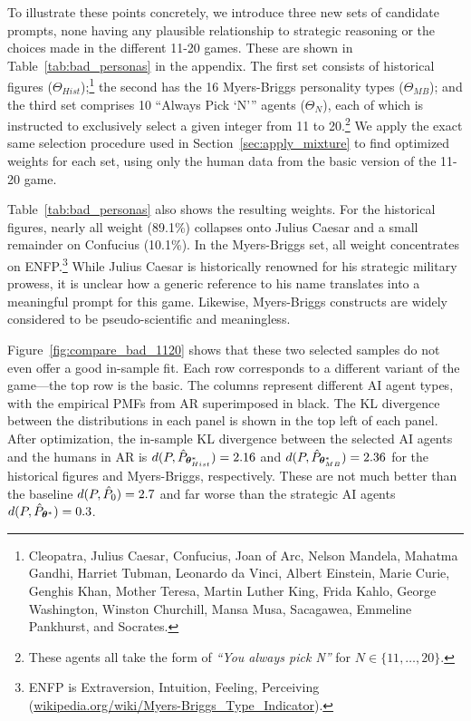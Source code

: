 \documentclass[11pt]{article}
\theoremstyle{definition}
\newcommand{\aisub}{AI agent}
\newcommand{\persona}{prompt}
\begin{document}
To illustrate these points concretely, we introduce three new sets of candidate \persona{s}, none having any plausible relationship to strategic reasoning or the choices made in the different 11-20 games.
These are shown in Table~\ref{tab:bad_personas} in the appendix.
The first set consists of historical figures ($\Theta_{Hist}$);\footnote{Cleopatra, Julius Caesar, Confucius, Joan of Arc, Nelson Mandela, Mahatma Gandhi, Harriet Tubman, Leonardo da Vinci, Albert Einstein, Marie Curie, Genghis Khan, Mother Teresa, Martin Luther King, Frida Kahlo, George Washington, Winston Churchill, Mansa Musa, Sacagawea, Emmeline Pankhurst, and Socrates.} the second has the 16 Myers-Briggs personality types ($\Theta_{MB}$); and the third set comprises 10 ``Always Pick `N''' agents ($\Theta_{N}$), each of which is instructed to exclusively select a given integer from 11 to 20.\footnote{These agents all take the form of \emph{``You always pick N''} for $N \in \{11,\ldots, 20\}$.}
We apply the exact same selection procedure used in Section~\ref{sec:apply_mixture} to find optimized weights for each set, using only the human data from the basic version of the 11-20 game.

Table~\ref{tab:bad_personas} also shows the resulting weights.
For the historical figures, nearly all weight (89.1\%) collapses onto Julius Caesar and a small remainder on Confucius (10.1\%).
In the Myers-Briggs set, all weight concentrates on ENFP.\footnote{ENFP is Extraversion, Intuition, Feeling, Perceiving (\url{wikipedia.org/wiki/Myers-Briggs_Type_Indicator}).} 
While Julius Caesar is historically renowned for his strategic military prowess, it is unclear how a generic reference to his name translates into a meaningful \persona{} for this game. 
Likewise, Myers-Briggs constructs are widely considered to be pseudo-scientific and meaningless.

Figure~\ref{fig:compare_bad_1120} shows that these two selected samples do not even offer a good in-sample fit.
Each row corresponds to a different variant of the game---the top row is the basic.
The columns represent different \aisub{} types, with the empirical PMFs from AR superimposed in black.
The KL divergence between the distributions in each panel is shown in the top left of each panel.
After optimization, the in-sample KL divergence between the selected \aisub{s} and the humans in AR is $d(P, \hat P_{\bm\theta^*_{Hist}}) =2.16$ and $d(P, \hat P_{\bm\theta^*_{MB}}) =2.36$ for the historical figures and Myers-Briggs, respectively.
These are not much better than the baseline $d(P, \hat P_0) =2.7$ and far worse than the strategic \aisub{s} $d(P, \hat P_{\bm\theta^*}) = 0.3$.
\end{document}
